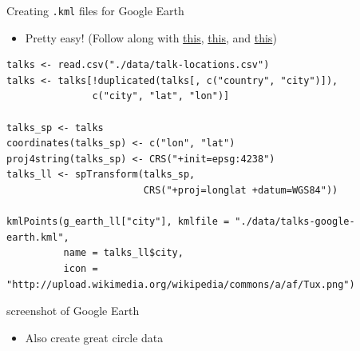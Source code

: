 \documentclass[sans,aspectratio=169,presentation,bigger,fleqn]{beamer}
\begin{document}
\begin{frame}[fragile,label=sec-22]{Creating \texttt{.kml} files for Google Earth}
 \begin{itemize}
\item Pretty easy! (Follow along with \href{http://www.nceas.ucsb.edu/scicomp/usecases/shapeFileToKML}{this}, \href{http://stackoverflow.com/questions/7813141/how-to-create-a-kml-file-using-r}{this}, and \href{http://stackoverflow.com/questions/21487010/assistance-with-name-and-styleurl-in-kml-when-using-writeogr-from-rgdal}{this})
\end{itemize}

\scriptsize
\begin{verbatim}
talks <- read.csv("./data/talk-locations.csv")
talks <- talks[!duplicated(talks[, c("country", "city")]),
               c("city", "lat", "lon")]

talks_sp <- talks
coordinates(talks_sp) <- c("lon", "lat")
proj4string(talks_sp) <- CRS("+init=epsg:4238")
talks_ll <- spTransform(talks_sp,
                        CRS("+proj=longlat +datum=WGS84"))

kmlPoints(g_earth_ll["city"], kmlfile = "./data/talks-google-earth.kml",
          name = talks_ll$city,
          icon = "http://upload.wikimedia.org/wikipedia/commons/a/af/Tux.png")
\end{verbatim}
\normalsize
\end{frame}

\begin{frame}[label=sec-23]{screenshot of Google Earth}
\begin{itemize}
\item Also create great circle data
\end{itemize}
\end{frame}
\end{document}
